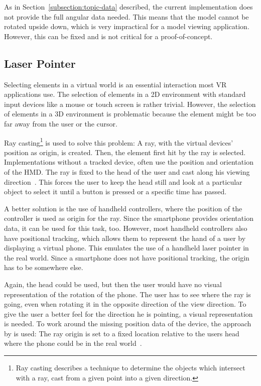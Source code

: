 As in Section~\ref{subsection:topic-data} described, the current implementation does not provide the full angular data needed. This means that the model cannot be rotated upside down, which is very impractical for a model viewing application. However, this can be fixed and is not critical for a proof-of-concept.


\subsection{Laser Pointer}\label{subsection:laser-pointer}

Selecting elements in a virtual world is an essential interaction most \ac{VR} applications use. The selection of elements in a \ac{2D} environment with standard input devices like a mouse or touch screen is rather trivial. However, the selection of elements in a \ac{3D} environment is problematic because the element might be too far away from the user or the cursor.

Ray casting\footnote{Ray casting describes a technique to determine the objects which intersect with a ray, cast from a given point into a given direction.} is used to solve this problem: A ray, with the virtual devices' position as origin, is created. Then, the element first hit by the ray is selected. Implementations without a tracked device, often use the position and orientation of the \ac{HMD}. The ray is fixed to the head of the user and cast along his viewing direction~\cite[23]{Kamm.2018}. This forces the user to keep the head still and look at a particular object to select it until a button is pressed or a specific time has passed.


A better solution is the use of handheld controllers, where the position of the controller is used as origin for the ray. Since the smartphone provides orientation data, it can be used for this task, too. However, most handheld controllers also have positional tracking, which allows them to represent the hand of a user by displaying a virtual phone. This emulates the use of a handheld laser pointer in the real world. Since a smartphone does not have positional tracking, the origin has to be somewhere else.

Again, the head could be used, but then the user would have no visual representation of the rotation of the phone. The user has to see where the ray is going, even when rotating it in the opposite direction of the view direction. To give the user a better feel for the direction he is pointing, a visual representation is needed.
To work around the missing position data of the device, the approach by \citeauthor{Pietroszek.2014} is used: The ray origin is set to a fixed location relative to the users head where the phone could be in the real world~\cite[Figure 3]{Pietroszek.2014}.

